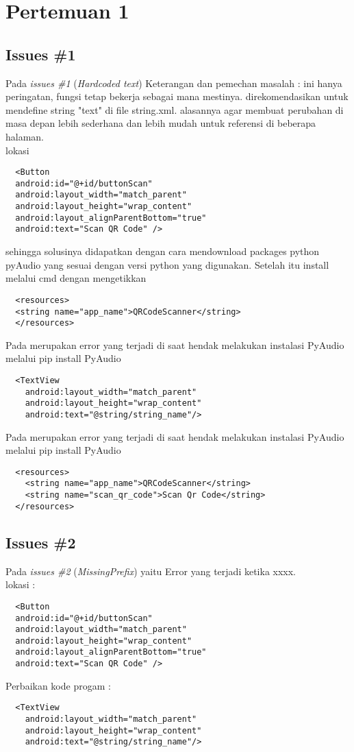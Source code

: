 \chapter{Pertemuan 1}

\section{Issues \#1}
Pada \textit{issues \#1} (\textit{Hardcoded text}) Keterangan dan pemechan masalah : ini hanya peringatan, fungsi tetap bekerja sebagai mana mestinya. direkomendasikan untuk mendefine string "text" di file string.xml. alasannya agar membuat perubahan di masa depan lebih sederhana dan lebih mudah untuk referensi di beberapa halaman.
\\lokasi
\begin{verbatim}
  <Button
  android:id="@+id/buttonScan"
  android:layout_width="match_parent"
  android:layout_height="wrap_content"
  android:layout_alignParentBottom="true"
  android:text="Scan QR Code" />       
\end{verbatim}
sehingga solusinya didapatkan dengan cara mendownload packages python pyAudio yang sesuai dengan versi python yang digunakan. Setelah itu install melalui cmd dengan mengetikkan \begin{verbatim}
  <resources>
  <string name="app_name">QRCodeScanner</string>
  </resources>
\end{verbatim}
Pada merupakan error yang terjadi di saat hendak melakukan instalasi PyAudio melalui pip install PyAudio\begin{verbatim}
  <TextView
    android:layout_width="match_parent"
    android:layout_height="wrap_content"
    android:text="@string/string_name"/>
\end{verbatim}
Pada merupakan error yang terjadi di saat hendak melakukan instalasi PyAudio melalui pip install PyAudio\begin{verbatim}
  <resources>
    <string name="app_name">QRCodeScanner</string>
    <string name="scan_qr_code">Scan Qr Code</string>
  </resources>
\end{verbatim}

\section{Issues \#2}
Pada \textit{issues \#2} (\textit{MissingPrefix}) yaitu Error yang terjadi ketika xxxx.
\\lokasi :
\begin{verbatim}
  <Button
  android:id="@+id/buttonScan"
  android:layout_width="match_parent"
  android:layout_height="wrap_content"
  android:layout_alignParentBottom="true"
  android:text="Scan QR Code" />       
\end{verbatim}
Perbaikan kode progam :\begin{verbatim}
  <TextView
    android:layout_width="match_parent"
    android:layout_height="wrap_content"
    android:text="@string/string_name"/>
\end{verbatim}

